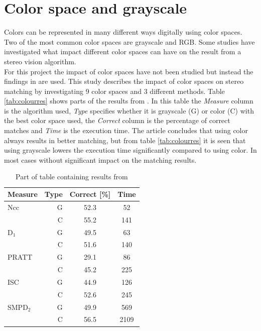 \section{Color space and grayscale} \label{sec:color}
Colors can be represented in many different ways digitally using color spaces. Two of the most common color spaces are grayscale and RGB. Some studies have investigated what impact different color spaces can have on the result from a stereo vision algorithm.\\ 

For this project the impact of color spaces have not been studied but instead the findings in \cite{chambon2005colour} are used. This study describes the impact of color spaces on stereo matching by investigating 9 color spaces and 3 different methods. Table \vref{tab:colourres} shows parts of the results from \cite{chambon2005colour}. In this table the \textit{Measure} column is the algorithm used, \textit{Type} specifies whether it is grayscale (G) or color (C) with the best color space used, the \textit{Correct} column is the percentage of correct matches and \textit{Time} is the execution time. The article concludes that using color always results in better matching, but from table \vref{tab:colourres} it is seen that using grayscale lowers the execution time significantly compared to using color. In most cases without significant impact on the matching results.\\
\begin{table}
  \centering
  \begin{tabular}{l r | c | c }
    Measure & Type & Correct [\%] & Time\\
    \midrule
    Ncc & G & 52.3 & 52\\
          & C & 55.2 & 141\\
    \midrule
    D$_1$ & G & 49.5 & 63\\
               & C & 51.6 & 140\\
    \midrule
    PRATT & G & 29.1 & 86\\
              & C & 45.2 & 225\\
    \midrule
    ISC & G & 44.9 & 126\\
    & C & 52.6 & 245\\
    \midrule
    SMPD$_2$ & G & 49.9 & 569\\
    & C & 56.5 & 2109 \\
  \end{tabular}
  \caption{Part of table containing results from \cite{chambon2005colour}\label{tab:colourres}}
\end{table}


